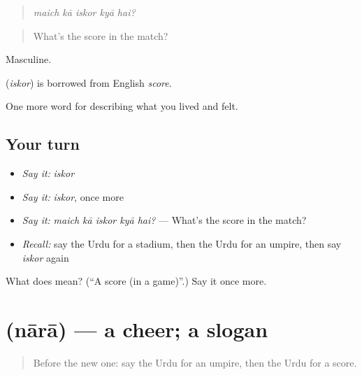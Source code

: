 \begin{quote}
    
\end{quote}

\begin{quote}
\emph{maich kā iskor kyā hai?}
\end{quote}

\begin{quote}
What's the score in the match?
\end{quote}

Masculine.

\begin{cousinweb}
\textbf{} (\emph{iskor}) is borrowed from English \emph{score}.
\end{cousinweb}

\begin{grammarlens}[title={What you've built}]
One more word for describing what you lived and felt.
\end{grammarlens}

\subsection*{Your turn}
\begin{itemize}
\raggedright
  \item \emph{Say it:} \emph{iskor}
  \item \emph{Say it:} \emph{iskor}, once more
  \item \emph{Say it:} \emph{maich kā iskor kyā hai?} — What's the score in the match?
  \item \emph{Recall:} say the Urdu for a stadium, then the Urdu for an umpire, then say \emph{iskor} again
\end{itemize}

\begin{tcolorbox}[breakable,colback=teal!4,colframe=teal!35!black,title={Before you move on}]
What does  mean? (\textquotedblleft{}A score (in a game)\textquotedblright{}.) Say it once more.
\end{tcolorbox}
\section[\texorpdfstring{\ur{نعرہ} (nārā)}{نعرہ (nārā)}]{ (nārā) — a cheer; a slogan}

\label{lesson:UR-C523-nara}



\begin{quote}
Before the new one: say the Urdu for an umpire, then the Urdu for a score.
\end{quote}

